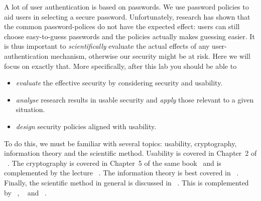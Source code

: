 A lot of user authentication is based on passwords.
We use password policies to aid users in selecting a secure password.
Unfortunately, research has shown that the common password-polices do not have 
the expected effect: users can still choose easy-to-guess passwords and the 
policies actually makes guessing easier.
It is thus important to \emph{scientifically} evaluate the actual effects of 
any user-authentication mechanism, otherwise our security might be at risk.
Here we will focus on exactly that.
More specifically, after this lab you should be able to
\begin{itemize}
  \item \emph{evaluate} the effective security by considering security and 
    usability.
  \item \emph{analyse} research results in usable security and \emph{apply} 
    those relevant to a given situation.
  \item \emph{design} security policies aligned with usability.
\end{itemize}

To do this, we must be familiar with several topics: usability, cryptography, 
information theory and the scientific method.
Usability is covered in Chapter~2 of 
~\cite{Anderson2008sea}.
The cryptography is covered in Chapter~5 of the same 
book~\cite{Anderson2008sea} and is complemented by the lecture 
~\cite{HighLevelCrypto}.
The information theory is best covered in 
~\cite{Ueltschi2013se}.
Finally, the scientific method in general is discussed in 
~\cite{ComputerSecurityExperiments}.
This is complemented by
~\cite{GuessAgainAndAgain},
~\cite{OfPasswordsAndPeople} and
~\cite{CanLongPasswordsBeSecureAndUsable}.
